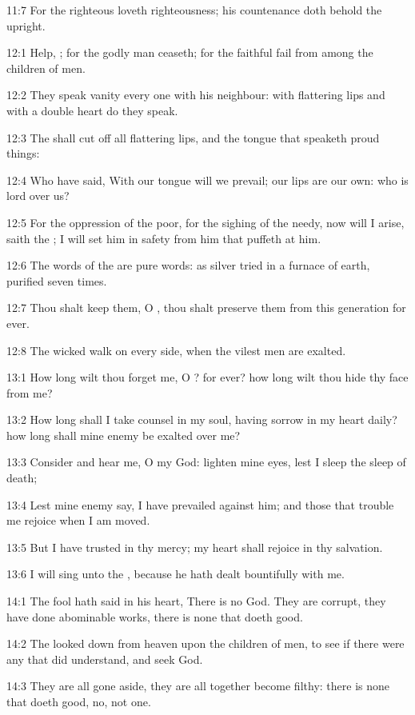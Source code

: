 11:7 For the righteous \LORD loveth righteousness; his countenance doth behold the upright.



12:1 Help, \LORD; for the godly man ceaseth; for the faithful fail from among the children of men.

12:2 They speak vanity every one with his neighbour: with flattering lips and with a double heart do they speak.

12:3 The \LORD shall cut off all flattering lips, and the tongue that speaketh proud things:

12:4 Who have said, With our tongue will we prevail; our lips are our own: who is lord over us?

12:5 For the oppression of the poor, for the sighing of the needy, now will I arise, saith the \LORD; I will set him in safety from him that puffeth at him.

12:6 The words of the \LORD are pure words: as silver tried in a furnace of earth, purified seven times.

12:7 Thou shalt keep them, O \LORD, thou shalt preserve them from this generation for ever.

12:8 The wicked walk on every side, when the vilest men are exalted.



13:1 How long wilt thou forget me, O \LORD? for ever? how long wilt thou hide thy face from me?

13:2 How long shall I take counsel in my soul, having sorrow in my heart daily? how long shall mine enemy be exalted over me?

13:3 Consider and hear me, O \LORD my God: lighten mine eyes, lest I sleep the sleep of death;

13:4 Lest mine enemy say, I have prevailed against him; and those that trouble me rejoice when I am moved.

13:5 But I have trusted in thy mercy; my heart shall rejoice in thy salvation.

13:6 I will sing unto the \LORD, because he hath dealt bountifully with me.



14:1 The fool hath said in his heart, There is no God. They are corrupt, they have done abominable works, there is none that doeth good.

14:2 The \LORD looked down from heaven upon the children of men, to see if there were any that did understand, and seek God.

14:3 They are all gone aside, they are all together become filthy: there is none that doeth good, no, not one.

